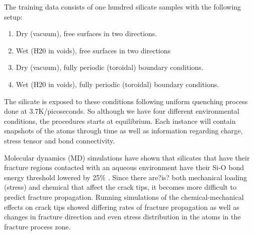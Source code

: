The training data consists of one hundred silicate samples with the following setup: 
\begin{enumerate}
    \item Dry (vacuum), free surfaces in two directions.
    \item Wet (H20 in voids), free surfaces in two directions
    \item Dry (vacuum), fully periodic (toroidal) boundary conditions.
    \item Wet (H20 in voids), fully periodic (toroidal) boundary conditions.
\end{enumerate}

The silicate is exposed to these conditions following uniform quenching process done at 3.7K/picoseconds. So although we have four different environmental conditions, the procedures starts at equilibrium.
Each instance will contain snapshots of the atoms through time as well as information regarding charge, stress tensor and bond connectivity. 

Molecular dynamics (MD) simulations have shown that silicates that have their fracture regions contacted with an aqueous environment have their Si-O bond energy threshold lowered by 25$\%$  \cite{chem_effects}. Since there are?is? both mechanical loading (stress) and chemical that affect the crack tips, it becomes more difficult to predict fracture propagation. Running simulations of the chemical-mechanical effects on crack tips showed differing rates of fracture propagation as well as changes in fracture direction and even stress distribution in the atoms in the fracture process zone. 


